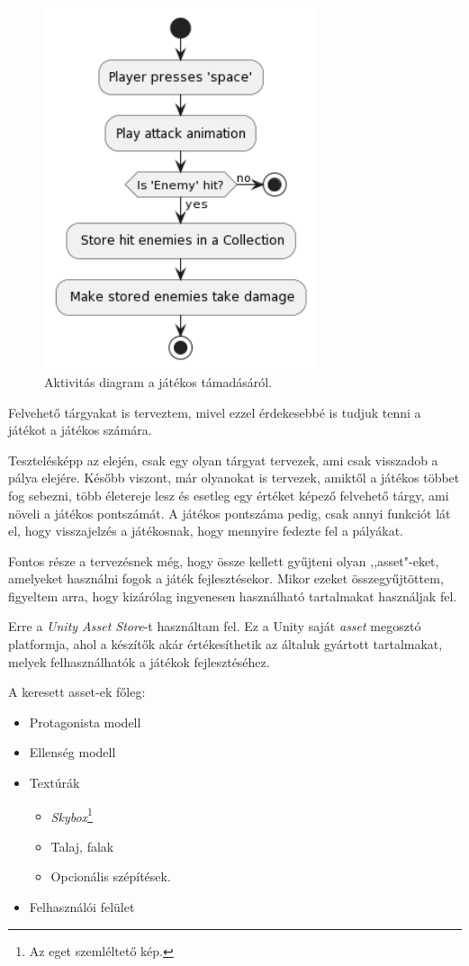 \documentclass[]{thesis-ekf}
\theoremstyle{definition}
\begin{document}
	\begin{figure}[!ht]
		\label{kep:attackchart}
		\centering
		\includegraphics[width=8cm]{attackchart}
		\caption{Aktivitás diagram a játékos támadásáról.}
	\end{figure}
	
	\pagebreak
	Felvehető tárgyakat is terveztem, mivel ezzel érdekesebbé is tudjuk tenni a játékot a játékos számára.
	
	Tesztelésképp az elején, csak egy olyan tárgyat tervezek, ami csak visszadob a pálya elejére. Később viszont, már olyanokat is tervezek, amiktől a játékos többet fog sebezni, több életereje lesz és esetleg egy értéket képező felvehető tárgy, ami növeli a játékos pontszámát. A játékos pontszáma pedig, csak annyi funkciót lát el, hogy visszajelzés a játékosnak, hogy mennyire fedezte fel a pályákat.
	
	Fontos része a tervezésnek még, hogy össze kellett gyűjteni olyan ,,asset"-eket, amelyeket használni fogok a játék fejlesztésekor.
	Mikor ezeket összegyűjtöttem, figyeltem arra, hogy kizárólag ingyenesen használható tartalmakat használjak fel.
	
	Erre a \emph{Unity Asset Store}-t használtam fel. Ez a Unity saját \emph{asset} megosztó platformja, ahol a készítők akár értékesíthetik az általuk gyártott tartalmakat, melyek felhasználhatók a játékok fejlesztéséhez.
	\pagebreak
	
	A keresett asset-ek főleg:
	
	\begin{itemize}
		\item Protagonista modell
		\item Ellenség modell
		\item Textúrák
		\begin{itemize}
			\item \emph{Skybox}\footnote{Az eget szemléltető kép.}
			\item Talaj, falak
			\item Opcionális szépítések.
		\end{itemize}
		\item Felhasználói felület
	\end{itemize}
	
\end{document}
